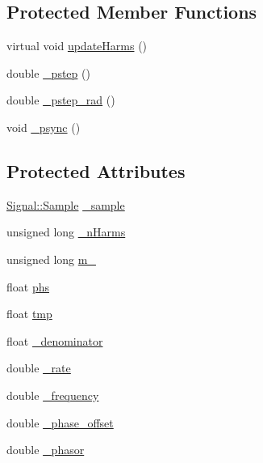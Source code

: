 \subsection*{Protected Member Functions}
\begin{DoxyCompactItemize}
\item 
virtual void \hyperlink{classDSG_1_1BLIT_1_1Saw_a15d758814a8c32ef935667546f7fd08b}{update\-Harms} ()
\item 
double \hyperlink{classDSG_1_1SignalGenerator_ac0d781b8673b3a283bf7c133290ede50}{\-\_\-pstep} ()
\item 
double \hyperlink{classDSG_1_1SignalGenerator_ae660eb4caa88b8d278f8d24d0908a487}{\-\_\-pstep\-\_\-rad} ()
\item 
void \hyperlink{classDSG_1_1SignalGenerator_a05baccb38d1e52860d4fcf7cb8430efc}{\-\_\-psync} ()
\end{DoxyCompactItemize}
\subsection*{Protected Attributes}
\begin{DoxyCompactItemize}
\item 
\hyperlink{classDSG_1_1Signal_1_1Sample}{Signal\-::\-Sample} \hyperlink{classDSG_1_1BLIT_1_1BLIT_ace572cf299ea45d5e6399d4a5a0dc31f}{\-\_\-sample}
\item 
unsigned long \hyperlink{classDSG_1_1BLIT_1_1BLIT_a487cca5adfe04a902c97aad8061c6c99}{\-\_\-n\-Harms}
\item 
unsigned long \hyperlink{classDSG_1_1BLIT_1_1BLIT_ac21b921cd1a9b2ec1d091ae8ed0502a2}{m\-\_\-}
\item 
float \hyperlink{classDSG_1_1BLIT_1_1BLIT_aa3e9fc9fd7ed43eb583d43c36329afb6}{phs}
\item 
float \hyperlink{classDSG_1_1BLIT_1_1BLIT_a9e6750c5ef251bce48cdb55ed45697bb}{tmp}
\item 
float \hyperlink{classDSG_1_1BLIT_1_1BLIT_aec52d8e6cca354ca19b3ea6b9bf02a9f}{\-\_\-denominator}
\item 
double \hyperlink{classDSG_1_1SignalGenerator_aa10f6c85d9adee901139ea7fb346f39d}{\-\_\-rate}
\item 
double \hyperlink{classDSG_1_1SignalGenerator_a67e296e3506dcdf09402c667cddff9ac}{\-\_\-frequency}
\item 
double \hyperlink{classDSG_1_1SignalGenerator_a9abf9d00c798e0fdca6314f17547758a}{\-\_\-phase\-\_\-offset}
\item 
double \hyperlink{classDSG_1_1SignalGenerator_ac2271b582bf699275f077ecb642a8cd9}{\-\_\-phasor}
\end{DoxyCompactItemize}


